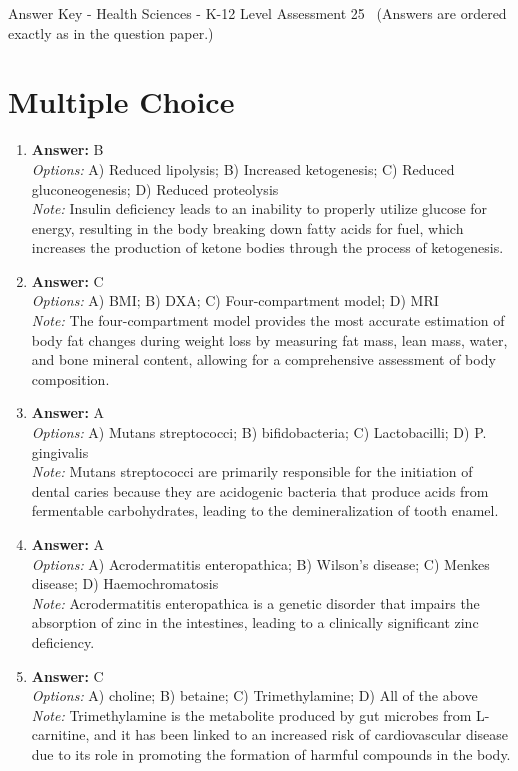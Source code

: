 \documentclass[12pt]{article}
\begin{document}
\begin{center}
Answer Key - Health Sciences - K-12 Level Assessment 25 \
\small (Answers are ordered exactly as in the question paper.)
\end{center}

\section*{Multiple Choice}
\begin{enumerate}[label=\arabic*.]
\item \textbf{Answer:} B
\\ \textit{Options:} A) Reduced lipolysis; B) Increased ketogenesis; C) Reduced gluconeogenesis; D) Reduced proteolysis
\\ \textit{Note:} Insulin deficiency leads to an inability to properly utilize glucose for energy, resulting in the body breaking down fatty acids for fuel, which increases the production of ketone bodies through the process of ketogenesis.
\item \textbf{Answer:} C
\\ \textit{Options:} A) BMI; B) DXA; C) Four-compartment model; D) MRI
\\ \textit{Note:} The four-compartment model provides the most accurate estimation of body fat changes during weight loss by measuring fat mass, lean mass, water, and bone mineral content, allowing for a comprehensive assessment of body composition.
\item \textbf{Answer:} A
\\ \textit{Options:} A) Mutans streptococci; B) bifidobacteria; C) Lactobacilli; D) P. gingivalis
\\ \textit{Note:} Mutans streptococci are primarily responsible for the initiation of dental caries because they are acidogenic bacteria that produce acids from fermentable carbohydrates, leading to the demineralization of tooth enamel.
\item \textbf{Answer:} A
\\ \textit{Options:} A) Acrodermatitis enteropathica; B) Wilson's disease; C) Menkes disease; D) Haemochromatosis
\\ \textit{Note:} Acrodermatitis enteropathica is a genetic disorder that impairs the absorption of zinc in the intestines, leading to a clinically significant zinc deficiency.
\item \textbf{Answer:} C
\\ \textit{Options:} A) choline; B) betaine; C) Trimethylamine; D) All of the above
\\ \textit{Note:} Trimethylamine is the metabolite produced by gut microbes from L-carnitine, and it has been linked to an increased risk of cardiovascular disease due to its role in promoting the formation of harmful compounds in the body.
\end{enumerate}
\end{document}
